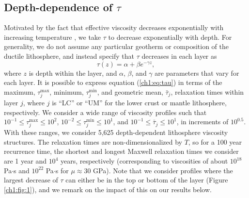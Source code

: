 \subsection{Depth-dependence of $\tau$}
Motivated by the fact that effective viscosity decreases exponentially
with increasing temperature \citep[e.g.,][]{Kohlstedt1995}, we take
$\tau$ to decrease exponentially with depth. For generality, we do not
assume any particular geotherm or composition of the ductile
lithosphere, and instead specify that $\tau$ decreases in each layer
as
\begin{equation}
\tau(z) = \alpha + \beta e^{-\gamma z},
\label{ch1:eq:tau}
\end{equation}
where $z$ is depth within the layer, and $\alpha$, $\beta$, and
$\gamma$ are parameters that vary for each layer. It is possible to
express equation (\ref{ch1:eq:tau}) in terms of the maximum,
$\tau_j^{\max}$, minimum, $\tau_j^{\min}$, and geometric mean,
$\bar{\tau}_j$, relaxation times within layer $j$, where $j$ is ``LC''
or ``UM'' for the lower crust or mantle lithosphere, respectively.  We
consider a wide range of viscosity profiles such that $10^{-1} \leq
\tau_j^{\max} \leq 10^{2}$, $10^{-2} \leq \tau_j^{\min} \leq 10^{1}$,
and $10^{-1} \leq \bar{\tau}_j \leq 10^{1}$, in increments of
$10^{0.5}$.  With these ranges, we consider 5,625 depth-dependent
lithosphere viscosity structures. The relaxation times are
non-dimensionalized by $T$, so for a 100 year recurrence time, the
shortest and longest Maxwell relaxation times we consider are 1 year
and $10^{4}$ years, respectively (corresponding to viscosities of
about $10^{18}$ Pa$\cdot$s and $10^{22}$ Pa$\cdot$s for $\mu \approx
30$ GPa).  Note that we consider profiles where the largest decrease
of $\tau$ can either be in the top or bottom of the layer (Figure
\ref{ch1:fig:1}), and we remark on the impact of this on our results
below.

